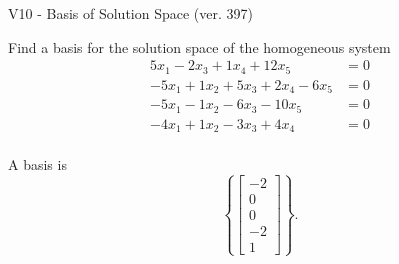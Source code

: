 \begin{exercise}
  \begin{exerciseTitle}V10 - Basis of Solution Space (ver. 397)\end{exerciseTitle}
  \begin{exerciseStatement}
    Find a basis for the solution space of the homogeneous system 
\begin{align*}
 5 x_ 1 -2 x_ 3 + 1 x_ 4 + 12 x_ 5 &= 0  \\ 
  -5 x_ 1 + 1 x_ 2 + 5 x_ 3 + 2 x_ 4 -6 x_ 5 &= 0  \\ 
  -5 x_ 1 -1 x_ 2 -6 x_ 3 -10 x_ 5 &= 0  \\ 
  -4 x_ 1 + 1 x_ 2 -3 x_ 3 + 4 x_ 4 &= 0  \\ 
 \end{align*}


 
  \end{exerciseStatement}

  \begin{exerciseAnswer}
   A basis is   
\[\left\{\left[\begin{array}{c}
-2 \\
0 \\
0 \\
-2 \\
1
\end{array}\right]\right\}.\]

  


  \end{exerciseAnswer}
\end{exercise}